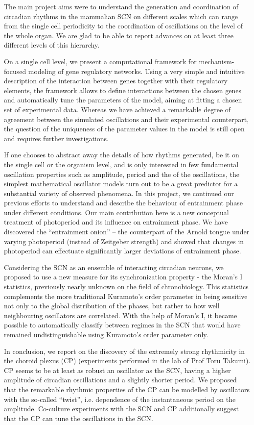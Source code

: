 The main project aims were to understand the generation and
coordination of circadian rhythms in the mammalian SCN on different
scales which can range from the single cell periodicity to the
coordination of oscillations on the level of the whole organ. We are
glad to be able to report advances on at least three different levels
of this hierarchy.

On a single cell level, we present a computational framework for
mechanism-focused modeling of gene regulatory networks. Using a very
simple and intuitive description of the interaction between genes
together with their regulatory elements, the framework allows to
define interactions between the chosen genes and automatically tune
the parameters of the model, aiming at fitting a chosen set of
experimental data.  Whereas we have achieved a remarkable degree of
agreement between the simulated oscillations and their experimental
counterpart, the question of the uniqueness of the parameter values in
the model is still open and requires further investigations.

If one chooses to abstract away the details of how rhythms generated,
be it on the single cell or the organism level, and is only interested
in few fundamental oscillation properties such as amplitude, period
and the of the oscillations, the simplest mathematical oscillator
models turn out to be a great predictor for a substantial variety of
observed phenomena. In this project, we continued our previous efforts
to understand and describe the behaviour of entrainment phase under
different conditions. Our main contribution here is a new conceptual
treatment of photoperiod and its influence on entrainment phase. We
have discovered the ``entrainment onion'' \--- the counterpart of the
Arnold tongue under varying photoperiod (instead of Zeitgeber
strength) and showed that changes in photoperiod can effectuate
significantly larger deviations of entrainment phase.

Considering the SCN as an ensemble of interacting circadian neurons,
we proposed to use a new measure for its synchronization property -
the Moran's I statistics, previously nearly unknown on the field of
chronobiology. This statistics complements the more traditional
Kuramoto's order parameter in being sensitive not only to the global
distribution of the phases, but rather to how well neighbouring
oscillators are correlated. With the help of Moran's I, it became
possible to automatically classify between regimes in the SCN that
would have remained undistinguishable using Kuramoto's order parameter
only.

In conclusion, we report on the discovery of the extremely strong
rhythmicity in the choroid plexus (CP) (experiments performed in the
lab of Prof Toru Takumi). CP seems to be at least as robust an
oscillator as the SCN, having a higher amplitude of circadian
oscillations and a slightly shorter period. We proposed that the
remarkable rhythmic properties of the CP can be modelled by
oscillators with the so-called ``twist'', i.e. dependence of the
instantaneous period on the amplitude. Co-culture experiments with the
SCN and CP additionally suggest that the CP can tune the oscillations
in the SCN.
